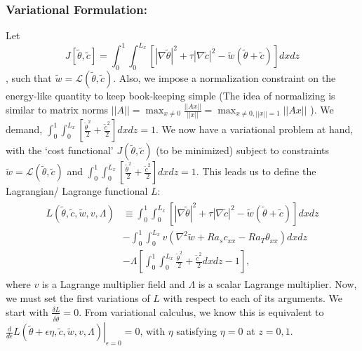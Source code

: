 \documentclass{article}
\newcommand{\grad}[1]{\nabla{#1}}
\newcommand{\lap}[1]{\nabla^{2}{#1}}
\begin{document}
\subsubsection{Variational Formulation:}
Let 
%
\begin{equation}
 J[\tilde{\theta}, \tilde{c}] = \int_{0}^{1} \int_{0}^{L_{x}} \left[|\grad{\tilde{\theta}}|^{2} + \tau |\grad{\tilde{c}}|^{2} - \tilde{w} (\tilde{\theta} + \tilde{c}) \right] dxdz
\end{equation}
%
, such that $\tilde{w} = \mathcal{L}(\tilde{\theta}, \tilde{c})$. Also, we impose a normalization constraint on the energy-like quantity to keep book-keeping simple (The idea of normalizing is similar to matrix norms $||A|| = \max_{x\neq 0} \frac{||Ax||}{||x||} = \max_{x \neq 0, ||x|| = 1} ||Ax||$ ). We demand, $\int_{0}^{1} \int_{0}^{L_{x}} \left[ \frac{\tilde{\theta}^{2}}{2} + \frac{\tilde{c}^{2}}{2} \right] dx dz  = 1$. We now have a variational problem at hand, with the `cost functional' $J(\tilde{\theta}, \tilde{c})$ (to be minimized) subject to constraints $\tilde{w} = \mathcal{L}(\tilde{\theta}, \tilde{c})$ and $\int_{0}^{1} \int_{0}^{L_{x}} \left[ \frac{\tilde{\theta}^{2}}{2} + \frac{\tilde{c}^{2}}{2} \right] dx dz  = 1$. This leads us to define the Lagrangian/ Lagrange functional $L$:
\begin{align}
 \begin{split}
   L(\tilde{\theta}, \tilde{c}, \tilde{w}, v, \Lambda)  &\equiv  \int_{0}^{1} \int_{0}^{L_{x}} \left[|\grad{\tilde{\theta}}|^{2} + \tau |\grad{\tilde{c}}|^{2} - \tilde{w} (\tilde{\theta}+ \tilde{c}) \right] dxdz \\
   &- \int_{0}^{1} \int_{0}^{L_{x}} v (\lap{\tilde{w}} + Ra_{s} c_{xx} - Ra_{T} \theta_{xx} ) dxdz \\
   &- \Lambda \left[\int_{0}^{1} \int_{0}^{L_{x}}  \frac{\tilde{\theta}^{2}}{2} + \frac{\tilde{c}^{2}}{2}  dx dz - 1\right],   
 \end{split}
\end{align}
where $v$ is a Lagrange multiplier field and $\Lambda$ is a scalar Lagrange multiplier. 
%
Now, we must set the first variations of $L$ with respect to each of its arguments. We start with $\frac{\delta L}{\delta \tilde{\theta}} = 0$. From variational calculus, we know this is equivalent to $\left. \frac{d}{d\epsilon}L(\tilde{\theta} + \epsilon \eta, \tilde{c}, \tilde{w}, v, \Lambda)\right|_{\epsilon = 0} = 0$, with $\eta$ satisfying $\eta = 0$ at $z = 0, 1$. 
\end{document}
